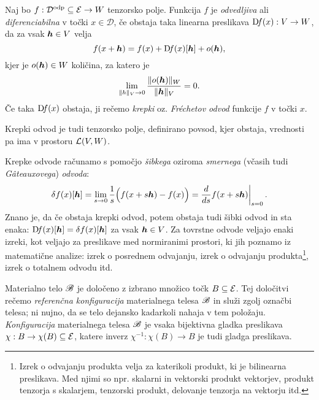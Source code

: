 \begin{definicija}
	Naj bo $f:\mathcal{D}^{\mathrm{odp}}\subseteq\mathcal E\to W$ tenzorsko polje. Funkcija $f$ je \emph{odvedljiva}
	ali \emph{diferenciabilna} v točki $x\in\mathcal{D}$,
	če obstaja taka linearna preslikava $\mathrm{D}\! f(x):V\to W$, da za vsak $\boldsymbol h\in V$ velja
	\begin{equation*}
		f(x+\boldsymbol h)=f(x)+\mathrm{D}\! f(x)[\boldsymbol h]+o(\boldsymbol h),
	\end{equation*}
	kjer je $o(\boldsymbol h)\in W$ količina, za katero je
	\[
		\lim_{\| h\|_V\to 0}\frac{\|o(\boldsymbol h)\|_W}{\|\boldsymbol h\|_V}=0.
	\]
	Če taka $\mathrm{D}\! f(x)$ obstaja, ji rečemo \emph{krepki} oz. \emph{Fréchetov odvod} funkcije $f$ v točki $x$.
\end{definicija}
Krepki odvod je tudi tenzorsko polje, definirano povsod, kjer obstaja, vrednosti pa ima v prostoru $\mathcal L(V,W)$.

Krepke odvode računamo s pomočjo \emph{šibkega} oziroma \emph{smernega} (včasih tudi \emph{Gâteauxovega}) \emph{odvoda}:
\begin{equation*}
	\delta f(x)[\vek{h}]=\lim_{s\to 0}\frac{1}{s}\Big(f(x+s\vek{h})-f(x)\Big)=
	\at{\frac{d}{ds}f(x+s\vek{h})}{s=0}.
\end{equation*}
Znano je, da če obstaja krepki odvod,
potem obstaja tudi šibki odvod in sta enaka: $\mathrm{D}\! f(x)[\boldsymbol h]=\delta f(x)[\boldsymbol h]$ za vsak $\boldsymbol h\in V$.
Za tovrstne odvode veljajo enaki izreki, kot veljajo za preslikave med normiranimi prostori, ki jih
poznamo iz matematične analize: izrek o posrednem odvajanju, izrek o odvajanju produkta\footnote{
Izrek o odvajanju produkta velja za katerikoli produkt, ki je bilinearna preslikava. Med njimi so
npr. skalarni in vektorski produkt vektorjev, produkt tenzorja s skalarjem, tenzorski produkt,
delovanje tenzorja na vektorju itd.},
izrek o totalnem odvodu itd.



Materialno telo $\mathscr B$ je določeno z izbrano množico točk $B\subseteq\mathcal E$. Tej določitvi rečemo
\emph{referenčna konfiguracija} materialnega telesa $\mathscr B$ in služi zgolj označbi telesa; ni nujno,
da se telo dejansko kadarkoli nahaja v tem položaju.
\emph{Konfiguracija} materialnega telesa $\mathscr B$ je vsaka bijektivna gladka preslikava $\chi:B\to\chi(B)\subseteq\mathcal E$,
katere inverz $\chi^{-1}:\chi(B)\to B$ je tudi gladga preslikava.
